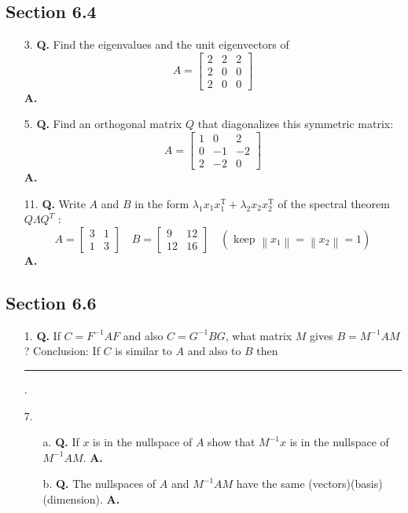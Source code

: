 \documentclass[main.tex]{subfiles}
\begin{document}
\subsection{Section 6.4}
\begin{enumerate}
    \item [3.] \textbf{Q.} Find the eigenvalues and the unit eigenvectors of
    $$
    A=\left[\begin{array}{lll}
    2 & 2 & 2 \\
    2 & 0 & 0 \\
    2 & 0 & 0
    \end{array}\right]
    $$
    \textbf{A.}
    
    \item [5.] \textbf{Q.} Find an orthogonal matrix $Q$ that diagonalizes this symmetric matrix:
    $$
    A=\left[\begin{array}{rrr}
    1 & 0 & 2 \\
    0 & -1 & -2 \\
    2 & -2 & 0
    \end{array}\right]
    $$
    \textbf{A.}
    
    \item [11.] \textbf{Q.} Write $A$ and $B$ in the form $\lambda_{1} x_{1} x_{1}^{\mathrm{T}}+\lambda_{2} x_{2} x_{2}^{\mathrm{T}}$ of the spectral theorem $Q \Lambda Q^{T}$ :
    $$
    A=\left[\begin{array}{ll}
    3 & 1 \\
    1 & 3
    \end{array}\right] \quad B=\left[\begin{array}{rr}
    9 & 12 \\
    12 & 16
    \end{array}\right] \quad\left(\text { keep }\left\|x_{1}\right\|=\left\|x_{2}\right\|=1\right)
    $$
    \textbf{A.}
    
\end{enumerate}

\subsection{Section 6.6}
\begin{enumerate}
    \item [1.] \textbf{Q.} If $C=F^{-1} A F$ and also $C=G^{-1} B G$, what matrix $M$ gives $B=M^{-1} A M$ ? Conclusion: If $C$ is similar to $A$ and also to $B$ then \rule{1cm}{0.15mm}.
    
    \item [7.]
    \begin{enumerate}
        \item [a.] \textbf{Q.} If $x$ is in the nullspace of $A$ show that $M^{-1} x$ is in the nullspace of $M^{-1} A M$. \textbf{A.}

        \item [b.] \textbf{Q.} The nullspaces of $A$ and $M^{-1} A M$ have the same (vectors)(basis)(dimension). \textbf{A.}
    \end{enumerate}
    
\end{enumerate}
\end{document}
